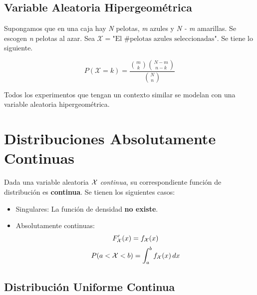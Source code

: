 
\subsection{Variable Aleatoria Hipergeométrica}

Supongamos que en una caja hay \textit N pelotas, \textit m azules y \textit{N - m} amarillas. Se escogen \textit n pelotas al azar.  Sea $\mathcal X = \text{"El \#pelotas azules seleccionadas"}$. Se tiene lo siguiente.

\[P(\mathcal X = k) = \frac{\binom{m}{k} \binom{N - m}{n-k} }{\binom{N}{n}}\]

Todos los experimentos que tengan un contexto similar se modelan con una variable aleatoria hipergeométrica.

\section{Distribuciones Absolutamente Continuas}
Dada una variable aleatoria $\mathcal{X}$ \textit{continua}, su correspondiente función de distribución es \textbf{continua}. Se tienen los siguientes casos:
\begin{itemize}
  \item Singulares: La función de densidad \textbf{no existe}. 
  \item Absolutamente continuas: \[F_{\mathcal{X}}'(x) = f_{\mathcal{X}}(x)\] \[P(a < \mathcal X < b) = \int_a^b f_{\mathcal{X}}(x)\,dx\]
\end{itemize}

\subsection{Distribución Uniforme Continua}

